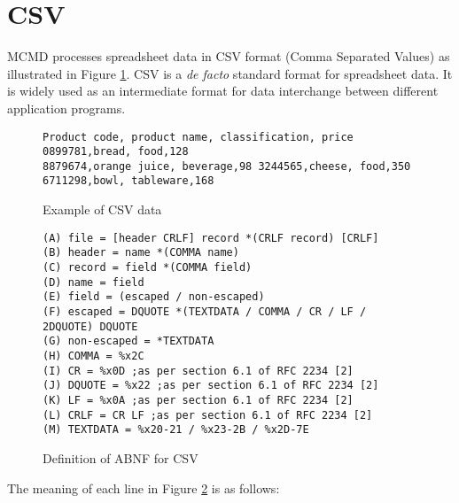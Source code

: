 
%

\section{CSV\label{sect:csv}}
MCMD processes spreadsheet data in CSV format (Comma Separated Values) as illustrated in Figure \ref{fig:csv_exp1}. CSV is a \textit{de facto} standard format for spreadsheet data. It is widely used as an intermediate format for data interchange between different application programs.

\begin{figure}[hbt]
\begin{Verbatim}[baselinestretch=0.7,frame=single]
Product code, product name, classification, price
0899781,bread, food,128
8879674,orange juice, beverage,98 3244565,cheese, food,350
6711298,bowl, tableware,168
\end{Verbatim}
\caption{Example of CSV data\label{fig:csv_exp1}}
\end{figure}

\begin{figure}[hbt]
\begin{Verbatim}[baselinestretch=0.7,frame=single]
(A) file = [header CRLF] record *(CRLF record) [CRLF]
(B) header = name *(COMMA name)
(C) record = field *(COMMA field)
(D) name = field
(E) field = (escaped / non-escaped)
(F) escaped = DQUOTE *(TEXTDATA / COMMA / CR / LF / 2DQUOTE) DQUOTE
(G) non-escaped = *TEXTDATA
(H) COMMA = %x2C
(I) CR = %x0D ;as per section 6.1 of RFC 2234 [2]
(J) DQUOTE = %x22 ;as per section 6.1 of RFC 2234 [2]
(K) LF = %x0A ;as per section 6.1 of RFC 2234 [2]
(L) CRLF = CR LF ;as per section 6.1 of RFC 2234 [2]
(M) TEXTDATA = %x20-21 / %x23-2B / %x2D-7E
\end{Verbatim}

\caption{Definition of ABNF for CSV\label{fig:csv_abnf}}
\end{figure}

The meaning of each line in Figure \ref{fig:csv_abnf} is as follows:


